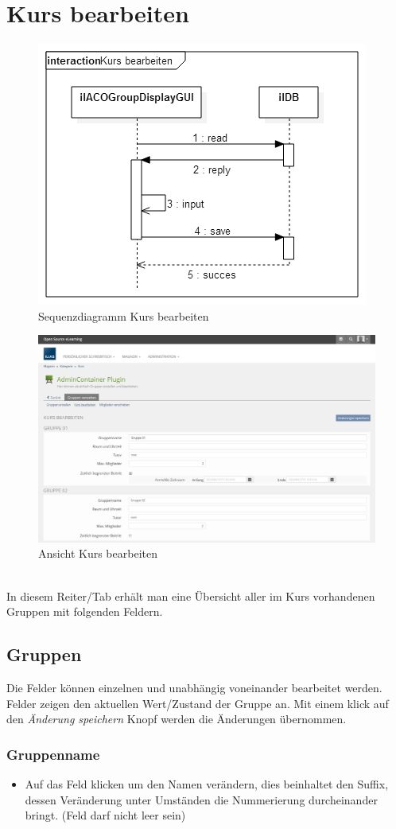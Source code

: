 \section{Kurs bearbeiten}
\begin{figure}[h!]
	\centering
	\includegraphics[width=.45\textwidth]{img/seq_groupdisplayGUI.png}
	\caption{Sequenzdiagramm Kurs bearbeiten}
\end{figure}
\begin{figure}[h!]
	\centering
	\includegraphics[width=.95\textwidth]{img/kursBearbeiten.png}
	\caption{Ansicht Kurs bearbeiten}
\end{figure}


~\\In diesem Reiter/Tab erhält man eine Übersicht aller im Kurs vorhandenen Gruppen mit folgenden Feldern.
\newpage
\subsection*{Gruppen}
Die Felder können einzelnen und unabhängig voneinander bearbeitet werden. Felder zeigen den aktuellen Wert/Zustand der Gruppe an. 
Mit einem klick auf den \textit{Änderung speichern} Knopf werden die Änderungen übernommen. 

\subsubsection{Gruppenname}
\begin{itemize}
	\item Auf das Feld klicken um den Namen verändern, dies beinhaltet den Suffix, dessen Veränderung unter Umständen die Nummerierung durcheinander bringt. (Feld darf nicht leer sein)
\end{itemize}

